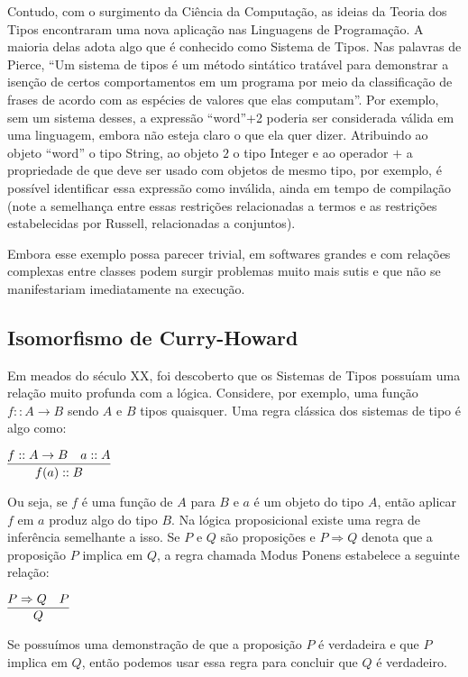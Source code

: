 \documentclass[12pt, oneside, a4paper,english,brazil]{abntex2}
\begin{document}
\qquad Contudo, com o surgimento da Ciência da Computação, as ideias da Teoria dos Tipos
encontraram uma nova aplicação nas Linguagens de Programação. A maioria delas adota
algo que é conhecido como Sistema de Tipos. Nas palavras de Pierce\cite{pierce}, ``Um sistema de
tipos é um método sintático tratável para demonstrar a isenção de certos comportamentos
em um programa por meio da classificação de frases de acordo com as espécies de valores
que elas computam''. Por exemplo, sem um sistema desses, a expressão ``word''+2 poderia
ser considerada válida em uma linguagem, embora não esteja claro o que ela quer dizer.
Atribuindo ao objeto ``word'' o tipo String, ao objeto $2$ o tipo Integer e ao operador
$+$ a propriedade de que deve ser usado com objetos de mesmo tipo, por exemplo, é
possível identificar essa expressão como inválida, ainda em tempo de compilação (note a
semelhança entre essas restrições relacionadas a termos e as restrições estabelecidas por
Russell, relacionadas a conjuntos).

\qquad Embora esse exemplo possa parecer trivial, em softwares grandes e com relações
complexas entre classes podem surgir problemas muito mais sutis e que não se manifestariam
imediatamente na execução.

\subsection*{Isomorfismo de Curry-Howard}
\qquad Em meados do século XX, foi descoberto que os Sistemas de Tipos possuíam uma
relação muito profunda com a lógica. Considere, por exemplo, uma função $f :: A \rightarrow B$
sendo $A$ e $B$ tipos quaisquer. Uma regra clássica dos sistemas de tipo é algo como:

\begin{center}
  $\infer{f(a) :: B}{f :: A \rightarrow B & a :: A}$
\end{center}

\qquad Ou seja, se $f$ é uma função de $A$ para $B$ e $a$ é um objeto do tipo $A$, então aplicar
$f$ em $a$ produz algo do tipo $B$. Na lógica proposicional existe uma regra de inferência
semelhante a isso. Se $P$ e $Q$ são proposições e $P \Rightarrow Q$ denota que a proposição $P$ implica
em $Q$, a regra chamada Modus Ponens estabelece a seguinte relação:

\begin{center}
  $\infer{Q}{P \Rightarrow Q & P}$
\end{center}

\qquad Se possuímos uma demonstração de que a proposição $P$ é verdadeira e que $P$
implica em $Q$, então podemos usar essa regra para concluir que $Q$ é verdadeiro.
\end{document}
